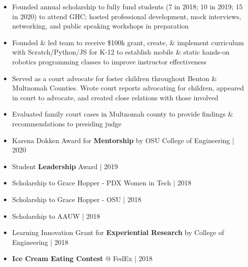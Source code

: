\begin{itemize}
    \item{Founded annual scholarship to fully fund students (7 in 2018; 10 in 2019; 15 in 2020) to attend GHC; hosted professional development, mock interviews, networking, and public speaking workshops in preparation}
\end{itemize} \smallskip

\begin{itemize}
    \item {Founded \& led team to receive \$100k grant, create, \& implement curriculum with Scratch/Python/JS for K-12 to establish mobile \& static hands-on robotics programming classes to improve instructor effectiveness}
\end{itemize} \smallskip

\begin{itemize}
    \item {Served as a court advocate for foster children throughout Benton \& Multnomah Counties. Wrote court reports advocating for children, appeared in court to advocate, and created close relations with those involved}
\end{itemize}

\begin{itemize}
    \item {Evaluated family court cases in Multnomah county to provide findings \& recommendations to presiding judge}
\end{itemize} \smallskip


\begin{itemize}
    \item{Karena Dokken Award for \textbf{Mentorship} by OSU College of Engineering | 2020}
    \item{Student \textbf{Leadership} Award | 2019}
    \item{Scholarship to Grace Hopper - PDX Women in Tech | 2018}
    \item{Scholarship to Grace Hopper - OSU | 2018}
    \item{Scholarship to AAUW | 2018}
    \item{Learning Innovation Grant for \textbf{Experiential Research} by College of Engineering | 2018}
    \item{\textbf{Ice Cream Eating Contest} @ FedEx | 2018}
\end{itemize}

